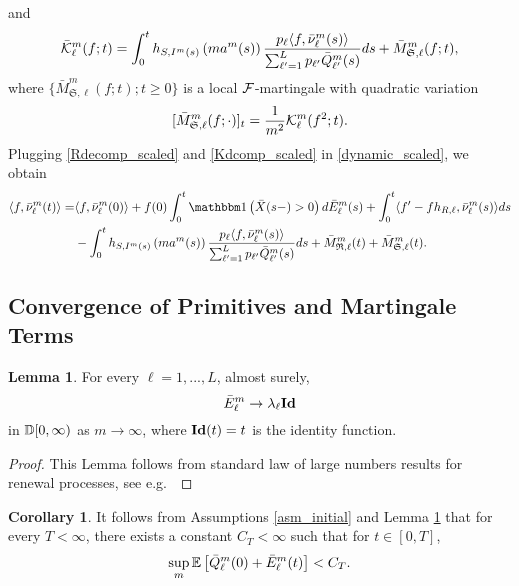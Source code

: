 \documentclass{article}
\theoremstyle{definition}
\newtheorem{lemma}[theorem]{Lemma}
\newtheorem{corollary}[theorem]{Corollary}
\numberwithin{equation}{section}
\begin{document}
and
\begin{equation}\label{Kdcomp_scaled}
    \bar{\mathcal{K}}^m_\ell(f;t)= \int_0^t h_{S,I^m(s)}\left(ma^m(s)\right)\frac{p_\ell \langle f,\bar{\nu}^m_\ell(s)\rangle }{\sum_{\ell'=1}^Lp_{\ell'}\bar {Q}^m_{\ell'}(s)} ds +  \bar M^m_{\mathfrak{S},\ell}(f;t),
\end{equation}
where $\{\bar M^m_{\mathfrak{S},\ell}(f;t);t\geq0\}$ is a local $\mathcal{F}$-martingale with quadratic variation
\begin{equation}\label{MS_QV}
[\bar M^m_{\mathfrak{S},\ell}(f;\cdot)]_t=\frac{1}{m^2}\mathcal{K}^m_\ell(f^2;t).
\end{equation}
Plugging \eqref{Rdecomp_scaled} and \eqref{Kdcomp_scaled} in \eqref{dynamic_scaled}, we obtain
\begin{align}\label{dynamic_scaled}
    \langle f,\bnu^m_\ell(t) \rangle = & \langle f,\bnu^m_\ell(0)\rangle + f(0)\int_0^t \indic{\bx(s-)>0} d \barrival^m_\ell(s) + \int_0^t \langle f'-fh_{R,\ell},\bnu^m_\ell(s)\rangle ds \notag\\
    & - \int_0^t h_{S,\class^m(s)}\left(m\age^m(s)\right)\frac{\weight_\ell \langle f,\bnu^m_\ell(s)\rangle }{\sum_{\ell'=1}^L\weight_{\ell'}\bql^m_{\ell'}(s)} ds +  \bar M^m_{\mathfrak{R},\ell}(t)+\bar M^m_{\mathfrak{S},\ell}(t).
\end{align}

\subsection{Convergence of Primitives and Martingale Terms}\label{sec_LLN}

\begin{lemma}\label{lem_Econv}
  For every $\ell=1,...,L$, almost surely,
  \[
  \bar E^m_\ell \to \lambda_\ell \textbf{Id}
  \]
  in $\mathbb{D}[0,\infty)$ as $m\to\infty$, where $\textbf{Id}(t)=t$ is the identity function.
\end{lemma}
\begin{proof}
  This Lemma follows from standard law of large numbers results for renewal processes, see e.g.\ \cite[Theorem 5.10]{CheYao2001}
\end{proof}

\begin{corollary}
  It follows from Assumptions \ref{asm_initial} and Lemma \ref{lem_Econv} that for every $T<\infty$, there exists a constant $C_T<\infty$ such that for $t\in[0,T]$,
  \begin{equation}\label{ineq_initial}
    \sup_m\mathbb{E}\left[\bar {Q}^m_\ell(0)+\bar E_\ell^m(t)\right]<C_T.
  \end{equation}
\end{corollary}
\end{document}
